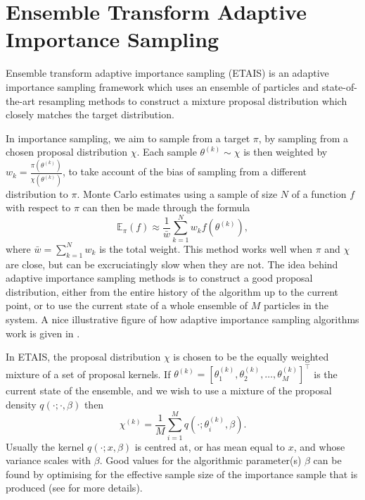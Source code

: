 \documentclass[final]{siamltex}
\newcommand{\edit}[1]{{\color{red} #1}}
\begin{document}
\section{Ensemble Transform Adaptive Importance Sampling}\label{sec:ETAIS}
Ensemble transform adaptive importance sampling
(ETAIS)\cite{cotter2015parallel} is an adaptive importance sampling framework
which uses an ensemble of particles and state-of-the-art resampling
methods to construct a mixture proposal distribution which closely
matches the target distribution. 

In importance sampling, we aim to sample from a target $\pi$, by
sampling from a chosen proposal distribution $\chi$. Each sample $\theta^{(k)} \sim \chi$ is then weighted by
$w_k = \frac{\pi(\theta^{(k)})}{\chi(\theta^{(k)})}$, to take account of the bias of
sampling from a different distribution to $\pi$. Monte Carlo estimates
using a sample of size $N$
of a function $f$ with respect to $\pi$ can then be made through the
formula
\begin{equation} \mathbb{E}_\pi(f) \approx \frac{1}{\bar{w}} \sum_{k=1}^N
  w_kf(\theta^{(k)}),\end{equation}
where $\bar{w} = \sum_{k=1}^N w_k$ is the total weight.
This method works well when $\pi$ and $\chi$ are close, but can be
excruciatingly slow when they are not. The idea behind adaptive
importance sampling methods is
to construct a good proposal distribution, either from the entire
history of the algorithm up to the current point, or to use the
current state of a whole ensemble of $M$ particles in the system.  \edit{A nice illustrative figure of how adaptive
  importance sampling algorithms work is given in \cite{bugallo2017adaptive}.}

In ETAIS, the proposal distribution $\chi$ is chosen to be the equally
weighted mixture of a set of proposal kernels. If $\theta^{(k)} = [\theta_1^{(k)},
\theta_2^{(k)}, \ldots, \theta_M^{(k)}]^\top$ is the current state of the
ensemble, and we wish to use a mixture of the proposal density $q(\cdot ;
\cdot, \beta)$ then 
\begin{equation}\chi^{(k)} = \frac{1}{M} \sum_{i=1}^M q(\cdot ; \theta_i^{(k)},
\beta).\end{equation}
Usually the kernel $q(\cdot ;
x,\beta)$ is centred at, or has mean equal to $x$, and whose variance
scales with $\beta$. Good values for the
algorithmic parameter(s) $\beta$ can be
found by optimising for the effective sample size of the importance
sample that is produced (see \cite{cotter2015parallel, russ2017parallel} for more details).
\end{document}
